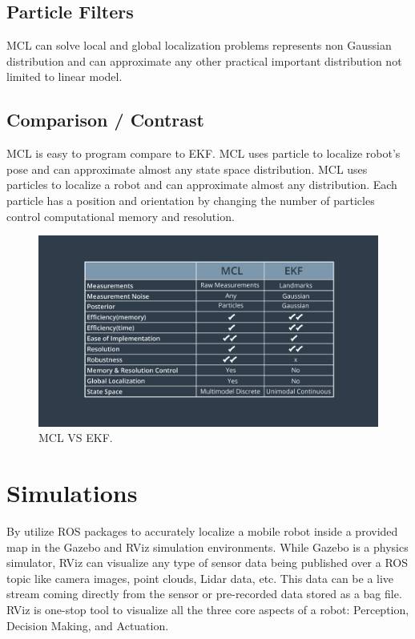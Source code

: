\documentclass[10pt,journal,compsoc]{IEEEtran}
\begin{document}
\subsection{Particle Filters}
MCL can solve local and global localization problems represents non Gaussian distribution and can approximate any other practical important distribution not limited to linear model. 
\subsection{Comparison / Contrast}
MCL is easy to program compare to EKF. MCL uses particle to localize robot's pose and can approximate almost any state space distribution. MCL uses particles to localize a robot and can approximate almost any distribution. Each particle has a position and orientation by changing the number of particles control computational memory and resolution.
\begin{figure}[thpb]
      \centering
      \includegraphics[width=\linewidth]{mclVsEKF.png}
      \caption{MCL VS EKF.}
      \label{fig:robot1}
\end{figure}
\section{Simulations}
 By utilize ROS packages to accurately localize a mobile robot inside a provided map in the Gazebo and RViz simulation environments. While Gazebo is a physics simulator, RViz can visualize any type of sensor data being published over a ROS topic like camera images, point clouds, Lidar data, etc. This data can be a live stream coming directly from the sensor or pre-recorded data stored as a bag file. RViz is one-stop tool to visualize all the three core aspects of a robot: Perception, Decision Making, and Actuation.  
 
\end{document}
